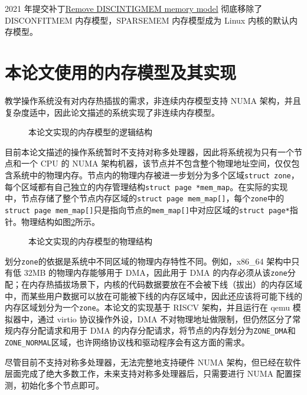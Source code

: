 \documentclass[AutoFakeBold]{LZUThesis}
\begin{document}
\begin{sloppypar}
2021 年提交补丁\href{https://lwn.net/Articles/858333}{Remove
DISCINTIGMEM memory model} 彻底移除了 DISCONFITMEM 内存模型，SPARSEMEM
内存模型成为 Linux 内核的默认内存模型。


\section{本论文使用的内存模型及其实现}

教学操作系统没有对内存热插拔的需求，非连续内存模型支持 NUMA
架构，并且复杂度适中，因此论文描述的系统实现了非连续内存模型。

\begin{figure}[H]
\centering

\caption{本论文实现的内存模型的逻辑结构}
\label{figure:memory-model-logical-structure}
\end{figure}

目前本论文描述的操作系统暂时不支持对称多处理器，因此将系统视为只有一个节点和一个
CPU 的 NUMA
架构机器，该节点并不包含整个物理地址空间，仅仅包含系统中的物理内存。节点内的物理内存被进一步划分为多个区域\texttt{struct\ zone}，每个区域都有自己独立的内存管理结构\texttt{struct\ page\ *mem\_map}。在实际的实现中，节点存储了整个节点内存区域的\texttt{struct\ page\ mem\_map{[}{]}}，每个\texttt{zone}中的\texttt{struct\ page\ mem\_map{[}{]}}只是指向节点的\texttt{mem\_map{[}{]}}中对应区域的\texttt{struct\ page*}指针。物理结构如图\ref{figure:memory-model-physical-structure}所示。

\begin{figure}[H]
\centering

\caption{本论文实现的内存模型的物理结构}
\label{figure:memory-model-physical-structure}
\end{figure}

划分\texttt{zone}的依据是系统中不同区域的物理内存特性不同。例如，x86\_64
架构中只有低 32MB 的物理内存能够用于 DMA，因此用于 DMA
的内存必须从该\texttt{zone}分配；在内存热插拔场景下，内核的代码数据要放在不会被下线（拔出）的内存区域中，而某些用户数据可以放在可能被下线的内存区域中，因此还应该将可能下线的内存区域划分为一个\texttt{zone}。本论文的实现基于
RISCV 架构，并且运行在 qemu 模拟器中，通过 virtio 协议操作外设，DMA
不对物理地址做限制，但仍然区分了常规内存分配请求和用于 DMA
的内存分配请求，将节点的内存划分为\texttt{ZONE\_DMA}和\texttt{ZONE\_NORMAL}区域，也许网络协议栈和驱动程序会有这方面的需求。

尽管目前不支持对称多处理器，无法完整地支持硬件 NUMA
架构，但已经在软件层面完成了绝大多数工作，未来支持对称多处理器后，只需要进行
NUMA 配置探测，初始化多个节点即可。


\end{sloppypar}
\end{document}

